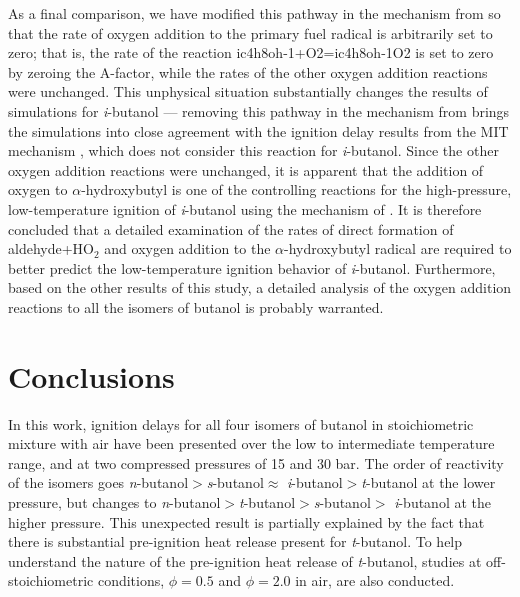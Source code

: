 \documentclass[12pt, letterpaper]{article}
\begin{document}
As a final comparison, we have modified this pathway in the mechanism from
\textcite{Sarathy2012} so that the rate of oxygen addition to the primary
fuel radical is arbitrarily set to zero; that is, the rate of the reaction
ic4h8oh-1+O2=ic4h8oh-1O2 is set to zero by zeroing the A-factor, while the
rates of the other oxygen addition reactions were unchanged. This unphysical
situation substantially changes the results of simulations for
\textit{i}-butanol --- removing this pathway in the mechanism from
\textcite{Sarathy2012} brings the simulations into close agreement with the
ignition delay results from the MIT mechanism \cite{Hansen2013,Merchant2013},
which does not consider this reaction for \textit{i}-butanol. Since the other
oxygen addition reactions were unchanged, it is apparent that the addition of
oxygen to $\alpha$-hydroxybutyl is one of the controlling reactions for the
high-pressure, low-temperature ignition of \textit{i}-butanol using the
mechanism of \textcite{Sarathy2012}. It is therefore concluded that a detailed
examination of the rates of direct formation of aldehyde+HO$_2$ and oxygen
addition to the $\alpha$-hydroxybutyl radical are required to better predict
the low-temperature ignition behavior of \textit{i}-butanol. Furthermore, based
on the other results of this study, a detailed analysis of the oxygen addition
reactions to all the isomers of butanol is probably warranted.

\section{Conclusions}
\label{sec:buoh-conclusions}

In this work, ignition delays for all four isomers of butanol in stoichiometric
mixture with air have been presented over the low to intermediate temperature
range, and at two compressed pressures of 15 and 30 bar. The order of
reactivity of the isomers goes \textit{n}-butanol$>$\textit{s}-butanol$\approx$
\textit{i}-butanol$>$\textit{t}-butanol at the lower pressure, but changes to
\textit{n}-butanol$>$\textit{t}-butanol$>$\textit{s}-butanol$>$
\textit{i}-butanol at the higher pressure. This unexpected result is partially
explained by the fact that there is substantial pre-ignition heat release
present for \textit{t}-butanol. To help understand the nature of the
pre-ignition heat release of \textit{t}-butanol, studies at off-stoichiometric
conditions, $\phi=0.5$ and $\phi=2.0$ in air, are also conducted.
\end{document}
